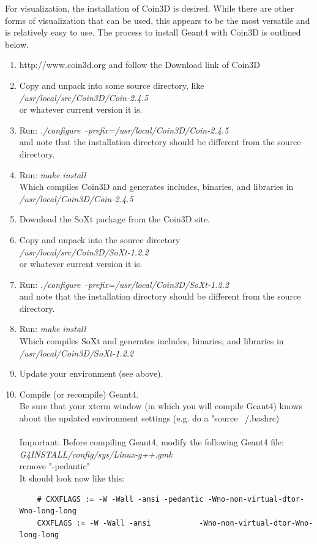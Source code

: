 For visualization, the installation of Coin3D is desired.
While there are other forms of visualization that can be used,
this appears to be the most versatile and is relatively easy
to use. The process to install Geant4 with Coin3D is outlined
below.

\begin{enumerate}
  \item{http://www.coin3d.org and follow the Download link of Coin3D}
  \item{Copy and unpack into some source directory, like \\
       {\em /usr/local/src/Coin3D/Coin-2.4.5} \\
       or whatever current version it is.}
  \item{Run: {\em ./configure --prefix=/usr/local/Coin3D/Coin-2.4.5} \\
        and note that the installation directory should be different
        from the source directory.}
  \item{Run: {\em make install} \\ Which compiles Coin3D and generates
        includes, binaries, and libraries in {\em /usr/local/Coin3D/Coin-2.4.5}}
  \item{Download the SoXt package from the Coin3D site.}
  \item{Copy and unpack into the source directory \\
       {\em /usr/local/src/Coin3D/SoXt-1.2.2} \\
       or whatever current version it is.}
  \item{Run: {\em ./configure --prefix=/usr/local/Coin3D/SoXt-1.2.2} \\
        and note that the installation directory should be different
        from the source directory.}
  \item{Run: {\em make install} \\ Which compiles SoXt and generates
        includes, binaries, and libraries in {\em /usr/local/Coin3D/SoXt-1.2.2}}
  \item{Update your environment (see above).}
  \item{Compile (or recompile) Geant4. \\
        Be sure that your xterm window (in which you will compile Geant4)
        knows about the updated environment settings
        (e.g. do a "source ~/.bashrc) \\ \\
	Important: Before compiling Geant4, modify the following Geant4 file: \\
        {\em G4INSTALL/config/sys/Linux-g++.gmk} \\
        remove "-pedantic" \\
	It should look now like this:
	\begin{verbatim}
	# CXXFLAGS := -W -Wall -ansi -pedantic -Wno-non-virtual-dtor-Wno-long-long
	CXXFLAGS := -W -Wall -ansi           -Wno-non-virtual-dtor-Wno-long-long
	\end{verbatim}
        }
\end{enumerate}

